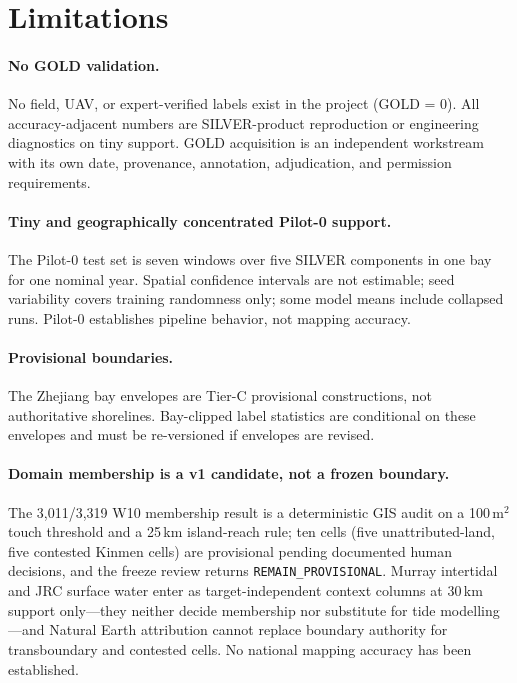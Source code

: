 \section{Limitations}\label{sec:limitations}

\paragraph{No GOLD validation.}
No field, UAV, or expert-verified labels exist in the project (GOLD
= 0). All accuracy-adjacent numbers are SILVER-product reproduction or
engineering diagnostics on tiny support. GOLD acquisition is an
independent workstream with its own date, provenance, annotation,
adjudication, and permission requirements.

\paragraph{Tiny and geographically concentrated Pilot-0 support.}
The Pilot-0 test set is seven windows over five SILVER components in one
bay for one nominal year. Spatial confidence intervals are not
estimable; seed variability covers training randomness only; some model
means include collapsed runs. Pilot-0 establishes pipeline behavior,
not mapping accuracy.

\paragraph{Provisional boundaries.}
The Zhejiang bay envelopes are Tier-C provisional constructions, not
authoritative shorelines. Bay-clipped label statistics are conditional
on these envelopes and must be re-versioned if envelopes are revised.

\paragraph{Domain membership is a v1 candidate, not a frozen boundary.}
The 3{,}011/3{,}319 W10 membership result is a deterministic GIS audit
on a 100\,m$^2$ touch threshold and a 25\,km island-reach rule; ten
cells (five unattributed-land, five contested Kinmen cells) are
provisional pending documented human decisions, and the freeze review
returns \texttt{REMAIN\_PROVISIONAL}. Murray intertidal and JRC surface
water enter as target-independent context columns at 30\,km support
only---they neither decide membership nor substitute for tide
modelling---and Natural Earth attribution cannot replace boundary
authority for transboundary and contested cells. No national mapping
accuracy has been established.

